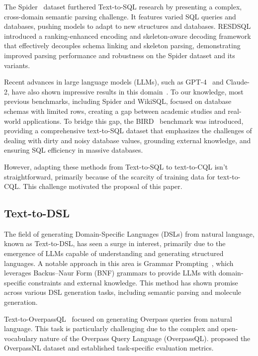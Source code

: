 \documentclass[11pt]{article}
\begin{document}
\begin{CJK*}{UTF8}{gbsn}
The Spider~\citep{yu-etal-2018-spider} dataset furthered Text-to-SQL research by presenting a complex, cross-domain semantic parsing challenge. 
It features varied SQL queries and databases, pushing models to adapt to new structures and databases. 
RESDSQL~\citep{li2023resdsql} introduced a ranking-enhanced encoding and skeleton-aware decoding framework that effectively decouples schema linking and skeleton parsing, demonstrating improved parsing performance and robustness on the Spider dataset and its variants.

Recent advances in large language models (LLMs), such as GPT-4~\citep{openai2023gpt4} and Claude-2, have also shown impressive results in this domain~\citep{gao2023texttosql, pourreza2023dinsql, dong2023c3}. 
To our knowledge, most previous benchmarks, including Spider and WikiSQL, focused on database schemas with limited rows, creating a gap between academic studies and real-world applications. 
To bridge this gap, the BIRD~\citep{li2023can} benchmark was introduced, providing a comprehensive text-to-SQL dataset that emphasizes the challenges of dealing with dirty and noisy database values, grounding external knowledge, and ensuring SQL efficiency in massive databases.

However, adapting these methods from Text-to-SQL to text-to-CQL isn't straightforward, primarily because of the scarcity of training data for text-to-CQL. 
This challenge motivated the proposal of this paper.

\subsection{Text-to-DSL}
\label{sec:text2dsl}

The field of generating Domain-Specific Languages (DSLs) from natural language, known as Text-to-DSL, has seen a surge in interest, primarily due to the emergence of LLMs capable of understanding and generating structured languages. 
A notable approach in this area is Grammar Prompting~\citep{wang2023grammar}, which leverages Backus–Naur Form (BNF) grammars to provide LLMs with domain-specific constraints and external knowledge. 
This method has shown promise across various DSL generation tasks, including semantic parsing and molecule generation.

Text-to-OverpassQL~\citep{staniek2023texttooverpassql} focused on generating Overpass queries from natural language. 
This task is particularly challenging due to the complex and open-vocabulary nature of the Overpass Query Language (OverpassQL). 
\citet{staniek2023texttooverpassql} proposed the OverpassNL dataset and established task-specific evaluation metrics.


\end{CJK*}
\end{document}
